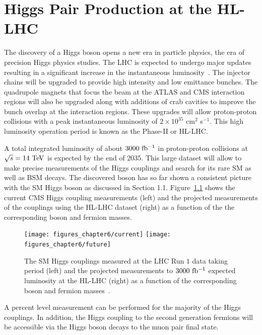 

\providecommand{\phasezero}{Phase-0 }
\providecommand{\phaseone}{Phase-I }
\providecommand{\phasetwo}{Phase-II }

\chapter{Higgs Pair Production at the HL-LHC}

The discovery of a Higgs boson opens a new era in particle physics, the era of precision Higgs physics studies. The LHC is expected to undergo major updates resulting in a significant increase in the instantaneous luminosity~\cite{Apollinari:2116337}.  The injector chains will be upgraded to provide high intensity and low emittance bunches. The quadrupole magnets that focus the beam at the ATLAS and CMS interaction regions will also be upgraded along with additions of crab cavities to improve the bunch overlap at the interaction regions. These upgrades will allow proton-proton collisions with a peak instantaneous luminosity of $2\times10^{35}$ cm$^2$ s$^{-1}$. This high luminosity operation period is known as the \phasetwo or HL-LHC. 

A total integrated luminosity of about $3000~\mathrm{fb^{-1}}$ in proton-proton collisions at $\sqrt{s}=14~\mathrm{Te\kern -0.1em V}$ is expected by the end of $2035$. This large dataset will allow to make precise measurements of the Higgs couplings and search for its rare SM as well as BSM decays. The discovered boson has so far shown a consistent picture with the SM Higgs boson as discussed in Section 1.1. Figure~\ref{fig:coupling} shows the current CMS Higgs coupling measurements (left) and the projected measurements of the couplings using the HL-LHC dataset (right) as a function of the the corresponding boson and fermion masses.      
\begin{figure}[hbtp]
  \begin{center}
    \texttt{[image: figures\_chapter6/current]}
    \texttt{[image: figures\_chapter6/future]}       
    \caption{The SM Higgs couplings measured at the LHC Run $1$ data taking period (left) and the projected measurements to $3000~\mathrm{fb^{-1}}$ expected luminosity at the HL-LHC (right) as a function of the corresponding boson and fermion masses~\cite{Butler:2020886}.}
    \label{fig:coupling}
  \end{center}
\end{figure}
A percent level measurement can be performed for the majority of the Higgs couplings. In addition, the Higgs coupling to the second generation fermions will be accessible via the Higgs boson decays to the muon pair final state. 

